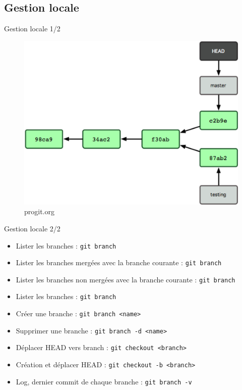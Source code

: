 \documentclass{beamer}
\begin{document}
\subsection*{Gestion locale}
\begin{frame}{Gestion locale 1/2}
  \begin{figure}
    \begin{center}
      \includegraphics[scale=0.7]{img/Branch1.png}
    \end{center}
    \caption{progit.org}
  \end{figure}
\end{frame}

\begin{frame}[containsverbatim]{Gestion locale 2/2}
  \begin{itemize}
  \item Lister les branches : \lstinline|git branch|
  \item Lister les branches mergées avec la branche courante : \lstinline|git branch|
  \item Lister les branches non mergées avec la branche courante : \lstinline|git branch|
  \item Lister les branches : \lstinline|git branch|
  \item Créer une branche : \lstinline|git branch <name>|
  \item Supprimer une branche : \lstinline|git branch -d <name>|
  \item Déplacer HEAD vers branch : \lstinline|git checkout <branch>|
  \item Création et déplacer HEAD : \lstinline|git checkout -b <branch>|
  \item Log, dernier commit de chaque branche : \lstinline|git branch -v|
  \end{itemize}
\end{frame}
\end{document}
